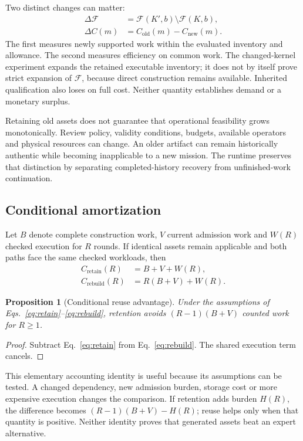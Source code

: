 \documentclass[11pt,a4paper]{article}
\newtheorem{proposition}{Proposition}
\begin{document}
Two distinct changes can matter:
\begin{align}
\Delta\mathcal{F}&=\mathcal{F}(K',b)\setminus\mathcal{F}(K,b), \label{eq:breadth}\\
\Delta C(m)&=C_{\mathrm{old}}(m)-C_{\mathrm{new}}(m). \label{eq:efficiency}
\end{align}
The first measures newly supported work within the evaluated inventory and allowance. The second measures efficiency on common work. The changed-kernel experiment expands the retained executable inventory; it does not by itself prove strict expansion of \(\mathcal{F}\), because direct construction remains available. Inherited qualification also loses on full cost. Neither quantity establishes demand or a monetary surplus.

Retaining old assets does not guarantee that operational feasibility grows monotonically. Review policy, validity conditions, budgets, available operators and physical resources can change. An older artifact can remain historically authentic while becoming inapplicable to a new mission. The runtime preserves that distinction by separating completed-history recovery from unfinished-work continuation.

\subsection{Conditional amortization}
Let \(B\) denote complete construction work, \(V\) current admission work and \(W(R)\) checked execution for \(R\) rounds. If identical assets remain applicable and both paths face the same checked workloads, then
\begin{align}
C_{\mathrm{retain}}(R)&=B+V+W(R), \label{eq:retain}\\
C_{\mathrm{rebuild}}(R)&=R(B+V)+W(R). \label{eq:rebuild}
\end{align}
\begin{proposition}[Conditional reuse advantage]\label{prop:reuse}
Under the assumptions of Eqs.~\eqref{eq:retain}--\eqref{eq:rebuild}, retention avoids \((R-1)(B+V)\) counted work for \(R\geq1\).
\end{proposition}
\begin{proof}
Subtract Eq.~\eqref{eq:retain} from Eq.~\eqref{eq:rebuild}. The shared execution term cancels.
\end{proof}
This elementary accounting identity is useful because its assumptions can be tested. A changed dependency, new admission burden, storage cost or more expensive execution changes the comparison. If retention adds burden \(H(R)\), the difference becomes \((R-1)(B+V)-H(R)\); reuse helps only when that quantity is positive. Neither identity proves that generated assets beat an expert alternative.
\end{document}
